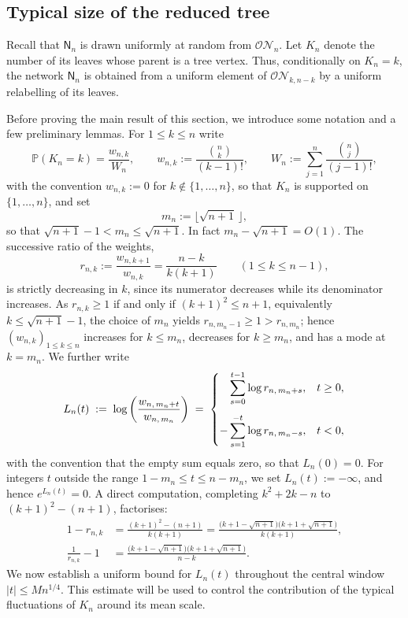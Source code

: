 \documentclass[english,11pt]{smfart}
\newcommand{\Prb}[1]{\mathbb{P}\left(#1\right)}
\newcommand{\cN}{\mathcal{N}}
\newcommand{\cO}{\mathcal{O}}
\newcommand{\mN}{\mathsf{N}}
\numberwithin{equation}{section}
\begin{document}
\subsection{Typical size of the reduced tree}
\label{sec:size}

Recall that $\mN_n$ is drawn uniformly at random from $\cO \cN_n$. Let $K_n$ denote the number of its leaves whose parent is a tree vertex. Thus, conditionally on $K_n=k$, the network $\mN_n$ is obtained from a uniform element of $\cO \cN_{k,n-k}$ by a uniform relabelling of its leaves.
\smallskip

Before proving the main result of this section, we introduce some notation and a few
preliminary lemmas. For $1\le k\le n$ write
\begin{equation}\label{eq: Kweights}
	\Prb{K_n=k}=\frac{w_{n,k}}{W_n},
	\qquad
	w_{n,k}:=\frac{\binom{n}{k}}{(k-1)!},
	\qquad
	W_n:=\sum_{j=1}^{n}\frac{\binom{n}{j}}{(j-1)!},
\end{equation}
with the convention $w_{n,k}:=0$ for $k\notin\{1,\dots,n\}$, so that $K_n$ is supported
on $\{1,\dots,n\}$, and set
\[
	m_n:=\bigl\lfloor\sqrt{n+1}\,\bigr\rfloor,
\]
so that $\sqrt{n+1}-1<m_n\le\sqrt{n+1}$. In fact $m_n-\sqrt{n+1} = O(1)$. The successive ratio of the weights,
\[
	r_{n,k}:=\frac{w_{n,k+1}}{w_{n,k}}=\frac{n-k}{k(k+1)}\qquad(1\le k\le n-1),
\]
is strictly decreasing in $k$, since its numerator decreases while its denominator
increases. As $r_{n,k}\ge1$ if and only if $(k+1)^2\le n+1$, equivalently
$k\le\sqrt{n+1}-1$, the choice of $m_n$ yields $r_{n,m_n-1}\ge1>r_{n,m_n}$; hence
$(w_{n,k})_{1\le k\le n}$ increases for $k\le m_n$, decreases for $k\ge m_n$, and has a
mode at $k=m_n$. We further write
\begin{equation}\label{eq:Ln}
  L_n(t)
  \;:=\;
  \log\left(\frac{w_{n,\,m_n+t}}{w_{n,\,m_n}}\right)
  \;=\;
  \begin{dcases}
    \phantom{-}\sum_{s=0}^{t-1}\log r_{n,\,m_n+s}, & t\ge 0,\\[1ex]
    -\sum_{s=1}^{-t}\log r_{n,\,m_n-s}, & t<0,
  \end{dcases}
\end{equation}
with the convention that the empty sum equals zero, so that \(L_n(0)=0\).
For integers \(t\) outside the range
\(1-m_n\le t\le n-m_n\), we set \(L_n(t):=-\infty\), and hence
\(e^{L_n(t)}=0\). A direct computation, completing $k^2+2k-n$ to $(k+1)^2-(n+1)$, factorises:
\begin{equation}\label{eq:ratio-id}
  \begin{aligned}
    1-r_{n,k}
    &=\frac{(k+1)^2-(n+1)}{k(k+1)}
    =\frac{\bigl(k+1-\sqrt{n+1}\bigr)\bigl(k+1+\sqrt{n+1}\bigr)}{k(k+1)},\\[0.5ex]
    \frac1{r_{n,k}}-1
    &=\frac{\bigl(k+1-\sqrt{n+1}\bigr)\bigl(k+1+\sqrt{n+1}\bigr)}{n-k}.
  \end{aligned}
\end{equation}
We now establish a uniform bound for \(L_n(t)\) throughout the central
window \(|t|\le M n^{1/4}\). This estimate will be used to control the
contribution of the typical fluctuations of \(K_n\) around its mean scale.
\end{document}
